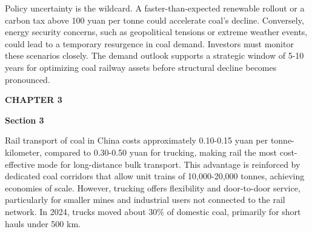 \documentclass[10pt,a4paper]{article}
\begin{document}
\vspace{4pt}{\textcolor{BOBlue}{\scriptsize\bfseries INDICATIVE DEVELOPMENT ROADMAP}}\par
\begin{center}\end{center}

{\small {\small Policy uncertainty is the wildcard. A faster-than-expected renewable rollout or a carbon tax above 100 yuan per tonne could accelerate coal's decline. Conversely, energy security concerns, such as geopolitical tensions or extreme weather events, could lead to a temporary resurgence in coal demand. Investors must monitor these scenarios closely. The demand outlook supports a strategic window of 5-10 years for optimizing coal railway assets before structural decline becomes pronounced.}}

\clearpage
{\textcolor{BOBlue}{\scriptsize\bfseries CHAPTER 3}}\par\vspace{-1pt}
{\Large\sffamily\bfseries\color{BONavy} Section 3}\par\vspace{4pt}
{\small Rail transport of coal in China costs approximately 0.10-0.15 yuan per tonne-kilometer, compared to 0.30-0.50 yuan for trucking, making rail the most cost-effective mode for long-distance bulk transport. This advantage is reinforced by dedicated coal corridors that allow unit trains of 10,000-20,000 tonnes, achieving economies of scale. However, trucking offers flexibility and door-to-door service, particularly for smaller mines and industrial users not connected to the rail network. In 2024, trucks moved about 30\% of domestic coal, primarily for short hauls under 500 km.}
\end{document}
